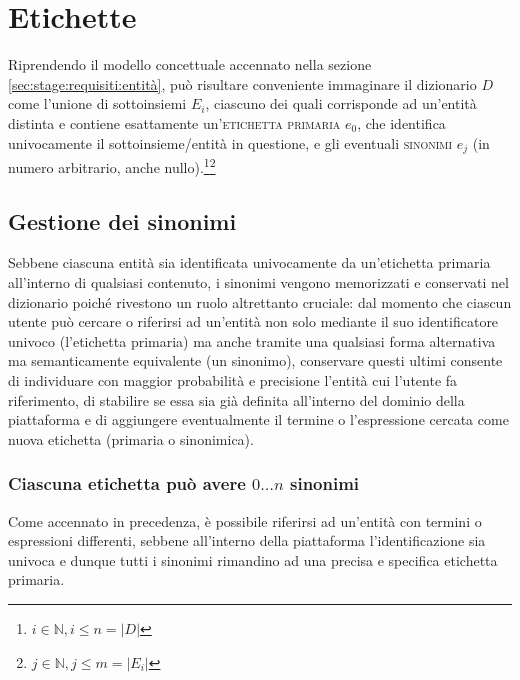 \documentclass[10pt,a4paper,headinclude,footinclude,hidelinks]{scrreprt} %
\begin{document}
	\section{Etichette}
	\label{sec:stage:requisiti:etichette}
	
	Riprendendo il modello concettuale accennato nella sezione \ref{sec:stage:requisiti:entità}, può risultare conveniente immaginare il dizionario $D$ come l'unione di sottoinsiemi $E_i$, ciascuno dei quali corrisponde ad un'entità distinta e contiene esattamente un'\textsc{etichetta primaria} $e_0$, che identifica univocamente il sottoinsieme/entità in questione, e gli eventuali \textsc{sinonimi} $e_j$ (in numero arbitrario, anche nullo).\footnote{$i \in \mathbb{N}, i \leq n=\left|D\right|$}\footnote{$j \in \mathbb{N}, j \leq m=\left|E_i\right|$}


	\subsection{Gestione dei sinonimi}
	\label{sec:stage:requisiti:etichette:sinonimi}
	Sebbene ciascuna entità sia identificata univocamente da un'etichetta primaria all'interno di qualsiasi contenuto, i sinonimi vengono memorizzati e conservati nel dizionario poiché rivestono un ruolo altrettanto cruciale: dal momento che ciascun utente può cercare o riferirsi ad un'entità non solo mediante il suo identificatore univoco (l'etichetta primaria) ma anche tramite una qualsiasi forma alternativa ma semanticamente equivalente (un sinonimo), conservare questi ultimi consente di individuare con maggior probabilità e precisione l'entità cui l'utente fa riferimento, di stabilire se essa sia già definita all'interno del dominio della piattaforma e di aggiungere eventualmente il termine o l'espressione cercata come nuova etichetta (primaria o sinonimica).

	\subsubsection{Ciascuna etichetta può avere $0\ldots n$ sinonimi}
	Come accennato in precedenza, è possibile riferirsi ad un'entità con termini o espressioni differenti, sebbene all'interno della piattaforma l'identificazione sia univoca e dunque tutti i sinonimi rimandino ad una precisa e specifica etichetta primaria.
	
\end{document}
